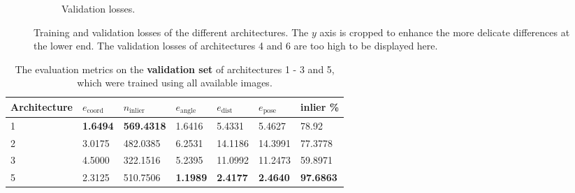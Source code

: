 \begin{figure}[!tbp]
\begin{subfigure}[t]{0.4\textwidth}
		\caption{Validation losses.}
	\end{subfigure}
	\caption{Training and validation losses of the different architectures. The $y$ axis is cropped to enhance the more delicate differences at the lower end. The validation losses of architectures 4 and 6 are too high to be displayed here.}
	\label{fig:experiments_architectures_loss}
\end{figure} 

\begin{table}[b]
\centering
\begin{tabular}{|l||llllll|} \hline
Architecture & $e_{\text{coord}}$ & $n_{\text{inlier}}$ & $e_{\text{angle}}$ & $e_{\text{dist}}$ & $e_{\text{pose}}$ & inlier \% \\ \hline \hline \rowcolor{Gray}
1            & \textbf{1.6494}    & \textbf{569.4318}   & 1.6416             & 5.4331   & 5.4627      & 78.92  \\ \hline
2            & 3.0175             & 482.0385            & 6.2531             & 14.1186            & 14.3991    & 77.3778       \\ \hline \rowcolor{Gray}
3            & 4.5000             & 322.1516            & 5.2395             & 11.0992            & 11.2473    & 59.8971        \\ \hline
5            & 2.3125             & 510.7506            & \textbf{1.1989}    & \textbf{2.4177}    & \textbf{2.4640}     & \textbf{97.6863} \\ \hline       
\end{tabular}
\caption{The evaluation metrics on the \textbf{validation set} of architectures 1 - 3 and 5, which were trained using all available images.}
\label{table:architecture_validation_metrics_comparison}
\end{table}

